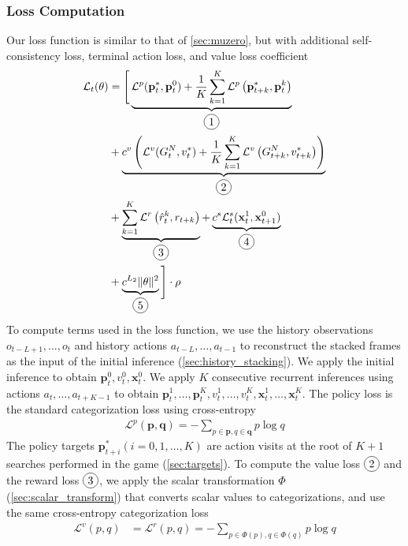 \subsubsection{Loss Computation} \label{sec:loss}
Our loss function is similar to that of \ref{sec:muzero}, but with additional self-consistency loss, terminal action loss, and value loss coefficient
\begin{align*}
    \mathcal{L}_{t}(\theta)
      & =
    \Bigg[
    \underbrace{\mathcal{L}^p(\mathbf{p}^*_t, \mathbf{p}^0_t) + \frac{1}{K}\sum_{k=1}^{K} \mathcal{L}^{p}\left(\mathbf{p}^*_{t+k}, \mathbf{p}_{t}^{k}\right)}_{\circled{1}}  \\
      & +
    \underbrace{c^v\left(\mathcal{L}^v(G^N_{t}, v^*_t) + \frac{1}{K}\sum_{k=1}^{K} \mathcal{L}^{v}\left(G^N_{t+k}, v^*_{t+k}\right) \right)}_{\circled{2}}  \\
      & +
    \underbrace{\sum_{k=1}^{K} \mathcal{L}^{r}\left(\hat{r}_t^k, r_{t+k}\right)}_{\circled{3}}
    +
    \underbrace{c^{s}\mathcal{L}^s_t(\mathbf{x}^1_t, \mathbf{x}^0_{t+1})}_{\circled{4}}  \\
      & +
    \underbrace{c^{L_2}\|\theta\|^{2}}_{\circled{5}}
    \Bigg] \cdot \rho
    \\
\end{align*}
To compute terms used in the loss function, we use the history observations \(o_{t-L+1}, \dots, o_t\) and history actions \(a_{t-L}, \dots, a_{t -1}\) to reconstruct the stacked frames as the input of the initial inference (\ref{sec:history_stacking}).
We apply the initial inference to obtain $\mathbf{p}^0_t, v^0_t, \mathbf{x}^0_t$.
We apply $K$ consecutive recurrent inferences using actions \(a_t, \dots, a_{t+K - 1}\) to obtain \(\mathbf{p}^1_t, \dots, \mathbf{p}^K_t, v^1_t, \dots, v^K_t, \mathbf{x}^1_t, \dots, \mathbf{x}^K_t\).
The policy loss  is the standard categorization loss using cross-entropy
\begin{align*}
    \mathcal{L}^p(\mathbf{p}, \mathbf{q}) = - \sum_{p \in \mathbf{p}, q \in \mathbf{q}} p \log{q}
\end{align*}
The policy targets $\mathbf{p}^*_{t+i} (i = 0, 1, \dots, K)$ are action visits at the root of $K+1$ searches performed in the game (\ref{sec:targets}).
To compute the value loss $\circled{2}$ and the reward loss $\circled{3}$, we apply the scalar transformation $\Phi$ (\ref{sec:scalar_transform}) that converts scalar values to categorizations,
and use the same cross-entropy categorization loss
\begin{align*}
    \mathcal{L}^v(p, q)  & = \mathcal{L}^r(p, q) = - \sum_{p \in \Phi(p), q \in \Phi(q)} p \log{q}  \\
\end{align*}
